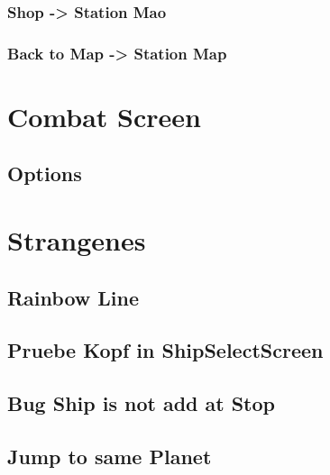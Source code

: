 \documentclass[11pt]{article}
\begin{document}
\subsubsection{Shop -> Station Mao}
\subsubsection{Back to Map -> Station Map}


\section{Combat Screen}
\label{sec:org9c941a6}
\subsection{Options}



\section{Strangenes}
\label{sec:org4b85c14}
\subsection{Rainbow Line}
\subsection{Pruebe Kopf in ShipSelectScreen}
\subsection{Bug Ship is not add at Stop}
\subsection{Jump to same Planet}
\end{document}
